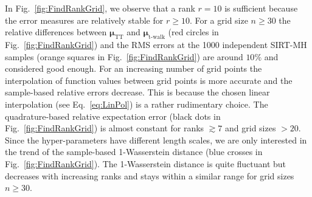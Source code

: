 In Fig.~\ref{fig:FindRankGrid}, we observe that a rank $r = 10$ is sufficient because the error measures are relatively stable for $r\geq10$.
For a grid size $n \geq 30$ the relative differences between $\bm{\mu}_{\text{TT}}$ and $\bm{\mu}_{\text{t-walk}}$ (red circles in Fig.~\ref{fig:FindRankGrid}) and the RMS errors at the 1000 independent SIRT-MH samples (orange squares in Fig.~\ref{fig:FindRankGrid}) are around $ 10\%$ and considered good enough.
For an increasing number of grid points the interpolation of function values between grid points is more accurate and the sample-based relative errors decrease.
This is because the chosen linear interpolation (see Eq.~\ref{eq:LinPol}) is a rather rudimentary choice.
The quadrature-based relative expectation error (black dots in Fig.~\ref{fig:FindRankGrid}) is almost constant for ranks $ \gtrsim 7$ and grid sizes $ > 20$.
Since the hyper-parameters have different length scales, we are only interested in the trend of the sample-based 1-Wasserstein distance (blue crosses in Fig.~\ref{fig:FindRankGrid}).
The 1-Wasserstein distance is quite fluctuant but decreases with increasing ranks and stays within a similar range for grid sizes $n \geq 30$.


